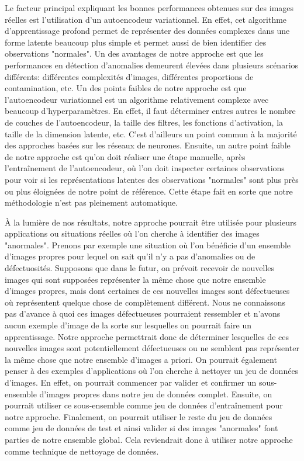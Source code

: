  Le facteur principal expliquant les bonnes performances obtenues sur des images réelles est l'utilisation d'un autoencodeur variationnel. En effet, cet algorithme d'apprentissage profond permet de représenter des données complexes dans une forme latente beaucoup plus simple et permet aussi de bien identifier des observations "normales". Un des avantages de notre approche est que les performances en détection d'anomalies demeurent élevées dans plusieurs scénarios différents: différentes complexités d'images, différentes proportions de contamination, etc. Un des points faibles de notre approche est que l'autoencodeur variationnel est un algorithme relativement complexe avec beaucoup d'hyperparamètres. En effet, il faut déterminer entres autres le nombre de couches de l'autoencodeur, la taille des filtres, les fonctions d'activation, la taille de la dimension latente, etc. C'est d'ailleurs un point commun à la majorité des approches basées sur les réseaux de neurones. Ensuite, un autre point faible de notre approche est qu'on doit réaliser une étape manuelle, après l'entraînement de l'autoencodeur, où l'on doit inspecter certaines observations pour voir si les représentations latentes des observations "normales" sont plus près ou plus éloignées de notre point de référence. Cette étape fait en sorte que notre méthodologie n'est pas pleinement automatique.
 
À la lumière de nos résultats, notre approche pourrait être utilisée pour plusieurs applications ou situations réelles où l'on cherche à identifier des images "anormales". Prenons par exemple une situation où l'on bénéficie d'un ensemble d'images propres pour lequel on sait qu'il n'y a pas d'anomalies ou de défectuosités. Supposons que dans le futur, on prévoit recevoir de nouvelles images qui sont supposées représenter la même chose que notre ensemble d'images propres, mais dont certaines de ces nouvelles images sont défectueuses où représentent quelque chose de complètement différent. Nous ne connaissons pas d'avance à quoi ces images défectueuses pourraient ressembler et n'avons aucun exemple d'image de la sorte sur lesquelles on pourrait faire un apprentissage. Notre approche permettrait donc de déterminer lesquelles de ces nouvelles images sont potentiellement défectueuses ou ne semblent pas représenter la même chose que notre ensemble d'images a priori. On pourrait également penser à des exemples d'applications où l'on cherche à nettoyer un jeu de données d'images. En effet, on pourrait commencer par valider et confirmer un sous-ensemble d'images propres dans notre jeu de données complet. Ensuite, on pourrait utiliser ce sous-ensemble comme jeu de données d'entraînement pour notre approche. Finalement, on pourrait utiliser le reste du jeu de données comme jeu de données de test et ainsi valider si des images "anormales" font parties de notre ensemble global. Cela reviendrait donc à utiliser notre approche comme technique de nettoyage de données.


